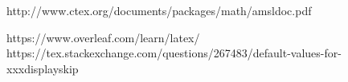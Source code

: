 http://www.ctex.org/documents/packages/math/amsldoc.pdf

https://www.overleaf.com/learn/latex/%
https://tex.stackexchange.com/questions/267483/default-values-for-xxxdisplayskip